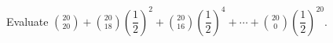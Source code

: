 Evaluate $\binom{20}{20}+\binom{20}{18}(\dfrac{1}{2})^2+\binom{20}{16}(\dfrac{1}{2})^4+\cdots+\binom{20}{0}(\dfrac{1}{2})^{20}$.

